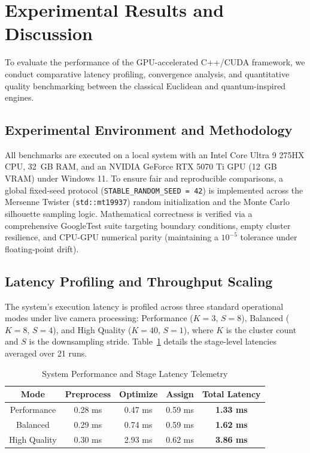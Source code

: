 \section{Experimental Results and Discussion}\label{sec:results}
To evaluate the performance of the GPU-accelerated C++/CUDA framework, we conduct comparative latency profiling, convergence analysis, and quantitative quality benchmarking between the classical Euclidean and quantum-inspired engines.

\subsection{Experimental Environment and Methodology}
All benchmarks are executed on a local system with an Intel Core Ultra 9 275HX CPU, 32~GB RAM, and an NVIDIA GeForce RTX 5070 Ti GPU (12~GB VRAM) under Windows 11. To ensure fair and reproducible comparisons, a global fixed-seed protocol (\texttt{STABLE\_RANDOM\_SEED = 42}) is implemented across the Mersenne Twister (\texttt{std::mt19937}) random initialization and the Monte Carlo silhouette sampling logic. Mathematical correctness is verified via a comprehensive GoogleTest suite targeting boundary conditions, empty cluster resilience, and CPU-GPU numerical parity (maintaining a $10^{-5}$ tolerance under floating-point drift).

\subsection{Latency Profiling and Throughput Scaling}
The system's execution latency is profiled across three standard operational modes under live camera processing: Performance ($K=3$, $S=8$), Balanced ($K=8$, $S=4$), and High Quality ($K=40$, $S=1$), where $K$ is the cluster count and $S$ is the downsampling stride. Table~\ref{tab:telemetry} details the stage-level latencies averaged over 21 runs.

\begin{table}[t]
\centering
\footnotesize
\caption{System Performance and Stage Latency Telemetry}
\label{tab:telemetry}
\begin{tabular}{ccccc}
\hline
\textbf{Mode} & \textbf{Preprocess} & \textbf{Optimize} & \textbf{Assign} & \textbf{Total Latency} \\ \hline
Performance  & 0.28 ms & 0.47 ms & 0.59 ms & \textbf{1.33 ms} \\
Balanced     & 0.29 ms & 0.74 ms & 0.59 ms & \textbf{1.62 ms} \\
High Quality & 0.30 ms & 2.93 ms & 0.62 ms & \textbf{3.86 ms} \\ \hline
\end{tabular}
\end{table}

